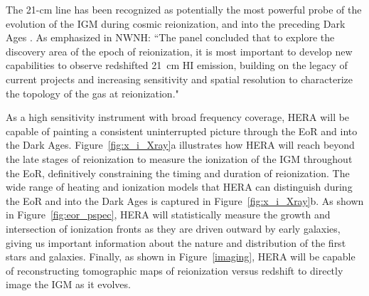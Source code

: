 \documentclass[preprint]{aastex}
\def\HI{{H{\small I }}}
\begin{document}
The 21-cm line has been recognized as potentially the most
powerful probe of the evolution of the IGM during cosmic reionization, and into
the preceding Dark Ages \citep{morales_wyithe2010,furlanetto_et_al2006}.
As emphasized in NWNH: ``The panel concluded that to explore the discovery
area of the epoch of reionization, it is most important to develop new
capabilities to observe redshifted 21~cm \HI emission, building on the legacy of
current projects and increasing sensitivity and spatial resolution to
characterize the topology of the gas at reionization."

As a high sensitivity instrument with broad frequency coverage, HERA will be
capable of painting a consistent uninterrupted picture through the EoR and into
the Dark Ages.
Figure~\ref{fig:x_i_Xray}a illustrates how HERA will
reach beyond the late stages of reionization to measure the
ionization of the IGM throughout the EoR, definitively constraining the timing
and duration of reionization.
The wide range of heating and ionization models that HERA
can distinguish during the EoR and into the Dark Ages is captured in
Figure~\ref{fig:x_i_Xray}b.  As shown in Figure~\ref{fig:eor_pspec},
HERA will statistically measure the growth and intersection
of ionization fronts as they are driven outward by early galaxies, giving
us important information about the nature and distribution of the first stars and galaxies.
Finally, as shown in Figure~\ref{imaging}, HERA will be capable of reconstructing
tomographic maps of reionization versus redshift to directly image the IGM as
it evolves.
\end{document}
